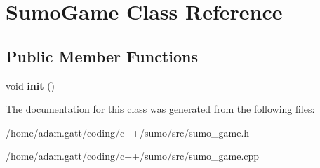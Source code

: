 \hypertarget{classSumoGame}{}\section{Sumo\+Game Class Reference}
\label{classSumoGame}
\subsection*{Public Member Functions}
\begin{DoxyCompactItemize}
\item 
\mbox{\label{classSumoGame_af4bae4a56609bc3046eb4abe30e16cb0}} 
void {\bfseries init} ()
\end{DoxyCompactItemize}


The documentation for this class was generated from the following files\+:\begin{DoxyCompactItemize}
\item 
/home/adam.\+gatt/coding/c++/sumo/src/sumo\+\_\+game.\+h\item 
/home/adam.\+gatt/coding/c++/sumo/src/sumo\+\_\+game.\+cpp\end{DoxyCompactItemize}
